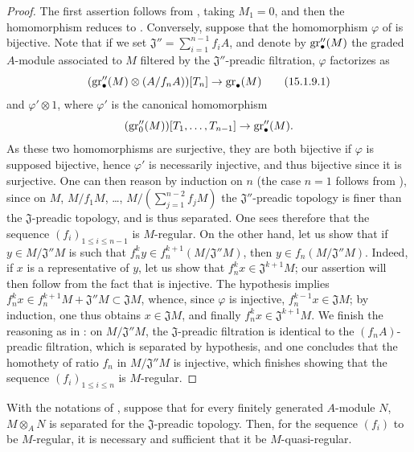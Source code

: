 \begin{proof}
The first assertion follows from , taking $M_1=0$, and then the homomorphism  reduces to .
Conversely, suppose that the homomorphism $\varphi$ of  is bijective.
Note that if we set $\mathfrak{J}''=\sum_{i=1}^{n-1}f_iA$,
and denote by $\operatorname{gr}''_\bullet(M)$ the graded $A$-module associated to $M$ filtered by the $\mathfrak{J}''$-preadic filtration, $\varphi$ factorizes as
\[
\label{0.15.1.9.1}
  (\operatorname{gr}''_\bullet(M)\otimes(A/f_nA))[T_n] \to \operatorname{gr}_\bullet(M)
\tag{15.1.9.1}
\]
and $\varphi'\otimes 1$, where $\varphi'$ is the canonical homomorphism
\[
  (\operatorname{gr}''_0(M))[T_1,\ldots,T_{n-1}] \to \operatorname{gr}''_\bullet(M).
\]
As these two homomorphisms are surjective, they are both bijective if $\varphi$ is supposed bijective, hence $\varphi'$ is necessarily injective, and thus bijective since it is surjective.
One can then reason by induction on $n$ (the case $n=1$ follows from ), since on $M$, $M/f_1M$, \ldots, $M/(\sum_{j=1}^{n-2}f_jM)$ the $\mathfrak{J}''$-preadic topology is finer than the $\mathfrak{J}$-preadic topology, and is thus separated.
One sees therefore that the sequence $(f_i)_{1\leq i\leq n-1}$ is $M$-regular.
On the other hand, let us show that if $y\in M/\mathfrak{J}''M$ is such that $f_n^ky\in f_n^{k+1}(M/\mathfrak{J}''M)$, then $y\in f_n(M/\mathfrak{J}''M)$.
Indeed, if $x$ is a representative of $y$, let us show that $f_n^kx\in\mathfrak{J}^{k+1}M$;
our assertion will then follow from the fact that  is injective.
The hypothesis implies $f_n^kx\in f_n^{k+1}M+\mathfrak{J}''M\subset\mathfrak{J}M$, whence, since $\varphi$ is injective, $f_n^{k-1}x\in\mathfrak{J}M$;
by induction, one thus obtains $x\in\mathfrak{J}M$, and finally $f_n^kx\in\mathfrak{J}^{k+1}M$.
We finish the reasoning as in :
on $M/\mathfrak{J}''M$, the $\mathfrak{J}$-preadic filtration is identical to the $(f_nA)$-preadic filtration, which is separated by hypothesis, and one concludes that the homothety of ratio $f_n$ in $M/\mathfrak{J}''M$ is injective, which finishes showing that the sequence $(f_i)_{1\leq i\leq n}$ is $M$-regular.
\end{proof}

\begin{corollary}[15.1.10]
\label{0.15.1.10}
With the notations of , suppose that for every finitely generated $A$-module $N$, $M\otimes_AN$ is separated for the $\mathfrak{J}$-preadic topology.
Then, for the sequence $(f_i)$ to be $M$-regular, it is necessary and sufficient that it be $M$-quasi-regular.
\end{corollary}

